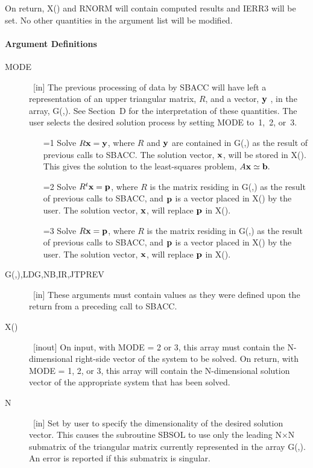 \documentclass[twoside]{MATH77}
\begin{document}
On return, X() and RNORM will contain computed results and IERR3 will be
set. No other quantities in the argument list will be modified.

\paragraph{Argument Definitions}

\begin{description}
\item[MODE]  \ [in] The previous processing of data by SBACC will have left
a representation of an upper triangular matrix, $R$, and a vector, ${\bf y}$%
, in the array, G(,). See Section~D for the interpretation of these quantities.
The user selects the desired solution process by setting MODE to~1,~2, or~3.

\begin{itemize}
\item[=1]  Solve $R{\bf x}={\bf y}$, where $R$ and ${\bf y}$ are
contained in G(,) as the result of previous calls to SBACC. The
solution vector, ${\bf x}$, will be stored in X(). This gives the solution
to the least-squares problem, $A{\bf x}\simeq {\bf b}.$

\item[=2]  Solve $R^t{\bf x}={\bf p}$, where $R$ is the matrix residing in
G(,) as the result of previous calls to SBACC, and ${\bf p}$ is a vector
placed in X() by the user. The solution vector, ${\bf x}$, will replace $%
{\bf p}$ in X().

\item[=3]  Solve $R{\bf x}={\bf p}$, where $R$ is the matrix residing in G(,)
as the result of previous calls to SBACC, and ${\bf p}$ is a vector placed
in X() by the user. The solution vector, ${\bf x}$, will replace ${\bf p}$
in X().
\end{itemize}

\item[G(,),LDG,NB,IR,JTPREV]  \ [in] These arguments must contain values as
they were defined upon the return from a preceding call to SBACC.

\item[X()]  \ [inout] On input, with MODE = 2 or 3, this array must contain
the N-dimensional right-side vector of the system to be solved. On return,
with MODE = 1, 2, or 3, this array will contain the N-dimensional solution
vector of the appropriate system that has been solved.

\item[N]  \ [in] Set by user to specify the dimensionality of the desired
solution vector. This causes the subroutine SBSOL to use only the leading N$%
\times $N submatrix of the triangular matrix currently represented in the
array G(,). An error is reported if this submatrix is singular.


\end{description}
\end{document}
